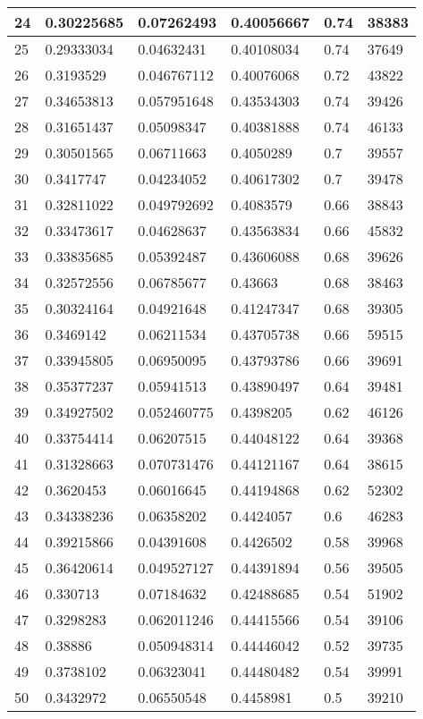 \begin{longtable}{|l|l|l|l|l|l|}
24 & 0.30225685 & 0.07262493 & 0.40056667 & 0.74 & 38383 \\ \hline 
25 & 0.29333034 & 0.04632431 & 0.40108034 & 0.74 & 37649 \\ \hline 
26 & 0.3193529 & 0.046767112 & 0.40076068 & 0.72 & 43822 \\ \hline 
27 & 0.34653813 & 0.057951648 & 0.43534303 & 0.74 & 39426 \\ \hline 
28 & 0.31651437 & 0.05098347 & 0.40381888 & 0.74 & 46133 \\ \hline 
29 & 0.30501565 & 0.06711663 & 0.4050289 & 0.7 & 39557 \\ \hline 
30 & 0.3417747 & 0.04234052 & 0.40617302 & 0.7 & 39478 \\ \hline 
31 & 0.32811022 & 0.049792692 & 0.4083579 & 0.66 & 38843 \\ \hline 
32 & 0.33473617 & 0.04628637 & 0.43563834 & 0.66 & 45832 \\ \hline 
33 & 0.33835685 & 0.05392487 & 0.43606088 & 0.68 & 39626 \\ \hline 
34 & 0.32572556 & 0.06785677 & 0.43663 & 0.68 & 38463 \\ \hline 
35 & 0.30324164 & 0.04921648 & 0.41247347 & 0.68 & 39305 \\ \hline 
36 & 0.3469142 & 0.06211534 & 0.43705738 & 0.66 & 59515 \\ \hline 
37 & 0.33945805 & 0.06950095 & 0.43793786 & 0.66 & 39691 \\ \hline 
38 & 0.35377237 & 0.05941513 & 0.43890497 & 0.64 & 39481 \\ \hline 
39 & 0.34927502 & 0.052460775 & 0.4398205 & 0.62 & 46126 \\ \hline 
40 & 0.33754414 & 0.06207515 & 0.44048122 & 0.64 & 39368 \\ \hline 
41 & 0.31328663 & 0.070731476 & 0.44121167 & 0.64 & 38615 \\ \hline 
42 & 0.3620453 & 0.06016645 & 0.44194868 & 0.62 & 52302 \\ \hline 
43 & 0.34338236 & 0.06358202 & 0.4424057 & 0.6 & 46283 \\ \hline 
44 & 0.39215866 & 0.04391608 & 0.4426502 & 0.58 & 39968 \\ \hline 
45 & 0.36420614 & 0.049527127 & 0.44391894 & 0.56 & 39505 \\ \hline 
46 & 0.330713 & 0.07184632 & 0.42488685 & 0.54 & 51902 \\ \hline 
47 & 0.3298283 & 0.062011246 & 0.44415566 & 0.54 & 39106 \\ \hline 
48 & 0.38886 & 0.050948314 & 0.44446042 & 0.52 & 39735 \\ \hline 
49 & 0.3738102 & 0.06323041 & 0.44480482 & 0.54 & 39991 \\ \hline 
50 & 0.3432972 & 0.06550548 & 0.4458981 & 0.5 & 39210 \\ \hline 
\end{longtable}